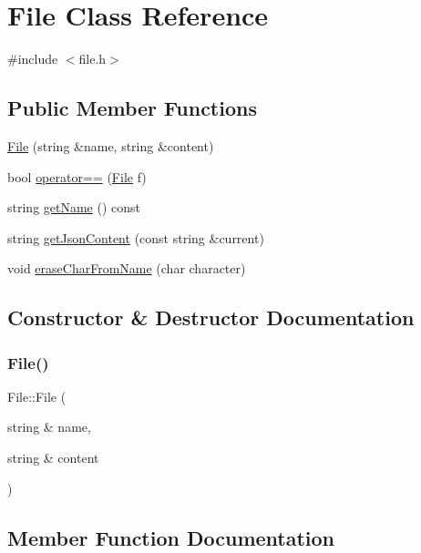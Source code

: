 \hypertarget{class_file}{}\section{File Class Reference}
\label{class_file}


{\ttfamily \#include $<$file.\+h$>$}

\subsection*{Public Member Functions}
\begin{DoxyCompactItemize}
\item 
\hyperlink{class_file_a87347ffc1d8cf9544036837353e37248}{File} (string \&name, string \&content)
\item 
bool \hyperlink{class_file_aadbe64432e7e403f546ff35a3bfa8d97}{operator==} (\hyperlink{class_file}{File} f)
\item 
string \hyperlink{class_file_a4b6032847dfd076db8ed44a532387f07}{get\+Name} () const
\item 
string \hyperlink{class_file_afaee512326a13dc99d6b8d08522eabe8}{get\+Json\+Content} (const string \&current)
\item 
void \hyperlink{class_file_aef2ef41308caf6124548ed6421b91188}{erase\+Char\+From\+Name} (char character)
\end{DoxyCompactItemize}


\subsection{Constructor \& Destructor Documentation}
\mbox{\label{class_file_a87347ffc1d8cf9544036837353e37248}} 
\subsubsection{\texorpdfstring{File()}{File()}}
{\footnotesize\ttfamily File\+::\+File (\begin{DoxyParamCaption}\item[{string \&}]{name,  }\item[{string \&}]{content }\end{DoxyParamCaption})\hspace{0.3cm}{\ttfamily [inline]}}



\subsection{Member Function Documentation}
\mbox{\label{class_file_aef2ef41308caf6124548ed6421b91188}} 
